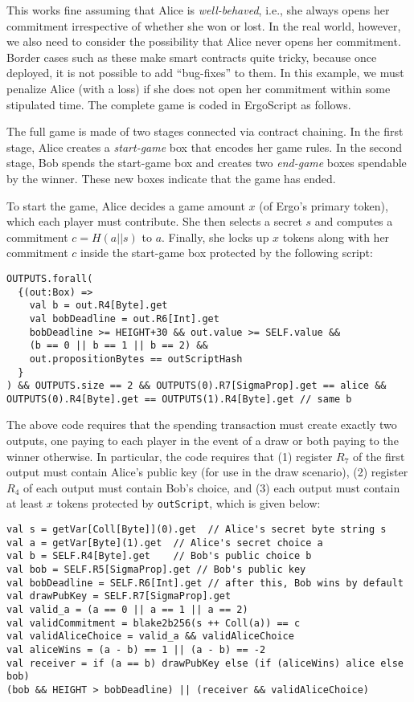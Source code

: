 \documentclass[runningheads]{llncs}
\newcommand{\langname}{ErgoScript\xspace}
\begin{document}
This works fine assuming that Alice is {\em well-behaved}, i.e., she always opens her commitment irrespective of whether she won or lost. In the real world, however, we also need to consider the possibility that Alice never opens her commitment. 
Border cases such as these make smart contracts quite tricky, because once deployed, it is not possible to add ``bug-fixes'' to them. In this example, we must penalize Alice (with a loss) if she does not open her commitment within some stipulated time.
The complete game is coded in \langname as follows.

The full game is made of two stages connected via contract chaining. In the first stage, Alice creates a {\em start-game} box that encodes her game rules. In the second stage, Bob spends the start-game box and creates two {\em end-game} boxes spendable by the winner. These new boxes indicate that the game has ended.

To start the game, Alice decides a game amount $x$ (of Ergo's primary token), which each player must contribute. She then selects a secret $s$ and computes a commitment $c=H(a||s)$ to $a$. Finally, she locks up $x$ tokens along with her commitment $c$ inside the start-game box protected by the following script:
\small{
	\begin{verbatim}
OUTPUTS.forall(
  {(out:Box) =>
    val b = out.R4[Byte].get
    val bobDeadline = out.R6[Int].get
    bobDeadline >= HEIGHT+30 && out.value >= SELF.value &&
    (b == 0 || b == 1 || b == 2) && 
    out.propositionBytes == outScriptHash
  }
) && OUTPUTS.size == 2 && OUTPUTS(0).R7[SigmaProp].get == alice &&
OUTPUTS(0).R4[Byte].get == OUTPUTS(1).R4[Byte].get // same b
	\end{verbatim}
}


The above code requires that the spending transaction must create exactly two outputs, one paying to each player in the event of a draw or both paying to the winner otherwise. In particular, the code requires that (1) register $R_7$ of the first output must contain Alice's public key (for use in the draw scenario), (2) register $R_4$ of each output must contain Bob's choice, and (3) each output must contain at least $x$ tokens protected by \texttt{outScript}, which is given below:

\small{
\begin{verbatim}
val s = getVar[Coll[Byte]](0).get  // Alice's secret byte string s
val a = getVar[Byte](1).get  // Alice's secret choice a
val b = SELF.R4[Byte].get    // Bob's public choice b
val bob = SELF.R5[SigmaProp].get // Bob's public key
val bobDeadline = SELF.R6[Int].get // after this, Bob wins by default
val drawPubKey = SELF.R7[SigmaProp].get
val valid_a = (a == 0 || a == 1 || a == 2) 
val validCommitment = blake2b256(s ++ Coll(a)) == c   
val validAliceChoice = valid_a && validAliceChoice
val aliceWins = (a - b) == 1 || (a - b) == -2
val receiver = if (a == b) drawPubKey else (if (aliceWins) alice else bob)
(bob && HEIGHT > bobDeadline) || (receiver && validAliceChoice)
\end{verbatim}
}
\end{document}
